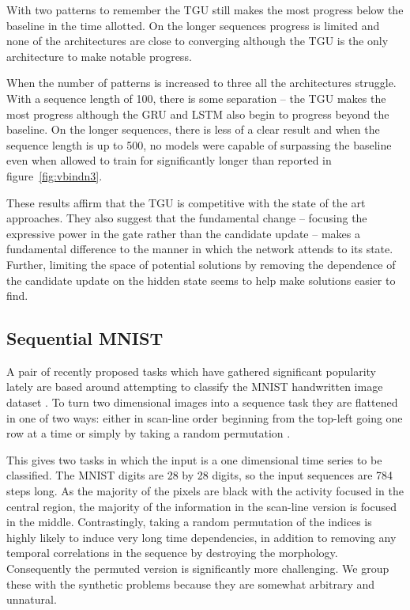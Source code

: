 With two patterns to remember the TGU still makes the most progress 
below the baseline in the time allotted.
On the longer sequences progress is limited and none of the architectures
are close to converging although the TGU is the only architecture to
make notable progress.

When the number of patterns is increased to three all the architectures struggle.
With a sequence length of 100, there is some separation -- the TGU makes the most
progress although the GRU and LSTM also begin to progress beyond the baseline.
On the longer sequences, there is less of a clear result and when the sequence
length is up to 500, no models were capable of surpassing the baseline even when
allowed to train for significantly longer than reported in figure~\ref{fig:vbindn3}.

These results affirm that the TGU is competitive with the state of the art approaches.
They also suggest that the fundamental change -- focusing the expressive power in the
gate rather than the candidate update -- makes a fundamental
difference to the manner in which the network attends to its state. Further, limiting
the space of potential solutions by removing the dependence of the candidate update on
the hidden state seems to help make solutions easier to find.


\subsection{Sequential MNIST}
A pair of recently proposed tasks which have gathered significant popularity lately
are based around attempting to classify the MNIST handwritten image dataset 
\autocite{Lecun1998}. To turn two dimensional images into a sequence task they are
flattened in one of two ways: either in scan-line order beginning from the top-left
going one row at a time or simply by taking a random permutation \autocite{Le2015}.

This gives two tasks in which the input is a one dimensional time series to be
classified. The MNIST digits are 28 by 28 digits, so the input sequences are
784 steps long. As the majority of the pixels are black with the activity focused
in the central region, the majority of the information in the scan-line version
is focused in the middle. Contrastingly, taking a random permutation of the indices
is highly likely to induce very long time dependencies, in addition to removing
any temporal correlations in the sequence by destroying the morphology. Consequently
the permuted version is significantly more challenging. We group these with the
synthetic problems because they are somewhat arbitrary and unnatural.

